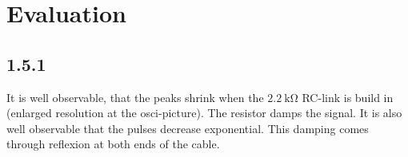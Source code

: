 \section{Evaluation}
\subsection{1.5.1}
It is well observable, that the peaks shrink when the $\SI{2.2}{\kilo\ohm}$ RC-link is build in (enlarged resolution at the osci-picture). The resistor damps the signal. It is also well observable that the pulses decrease exponential. This damping comes through reflexion at both ends of the cable.